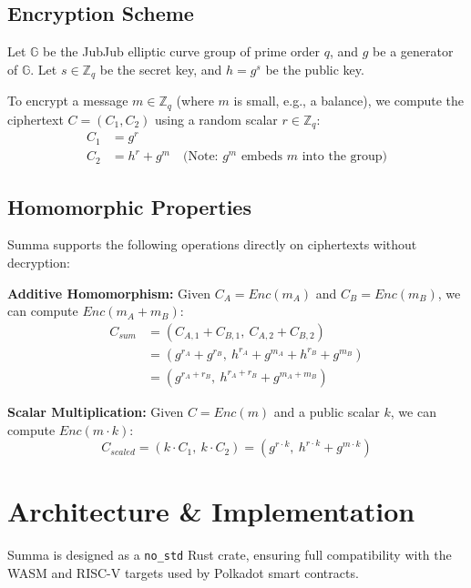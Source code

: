 \documentclass[11pt,a4paper]{article}
\begin{document}
\subsection{Encryption Scheme}
Let $\mathbb{G}$ be the JubJub elliptic curve group of prime order $q$, and $g$ be a generator of $\mathbb{G}$. Let $s \in \mathbb{Z}_q$ be the secret key, and $h = g^s$ be the public key.

To encrypt a message $m \in \mathbb{Z}_q$ (where $m$ is small, e.g., a balance), we compute the ciphertext $C = (C_1, C_2)$ using a random scalar $r \in \mathbb{Z}_q$:
\begin{align}
    C_1 &= g^r \\
    C_2 &= h^r + g^m \quad \text{(Note: } g^m \text{ embeds } m \text{ into the group)}
\end{align}

\subsection{Homomorphic Properties}
Summa supports the following operations directly on ciphertexts without decryption:

\textbf{Additive Homomorphism:} Given $C_A = Enc(m_A)$ and $C_B = Enc(m_B)$, we can compute $Enc(m_A + m_B)$:
\begin{align}
    C_{sum} &= (C_{A,1} + C_{B,1}, \ C_{A,2} + C_{B,2}) \\
            &= (g^{r_A} + g^{r_B}, \ h^{r_A} + g^{m_A} + h^{r_B} + g^{m_B}) \\
            &= (g^{r_A+r_B}, \ h^{r_A+r_B} + g^{m_A+m_B})
\end{align}

\textbf{Scalar Multiplication:} Given $C = Enc(m)$ and a public scalar $k$, we can compute $Enc(m \cdot k)$:
\begin{equation}
    C_{scaled} = (k \cdot C_1, \ k \cdot C_2) = (g^{r \cdot k}, \ h^{r \cdot k} + g^{m \cdot k})
\end{equation}

\section{Architecture \& Implementation}
Summa is designed as a \texttt{no\_std} Rust crate, ensuring full compatibility with the WASM and RISC-V targets used by Polkadot smart contracts.
\end{document}
